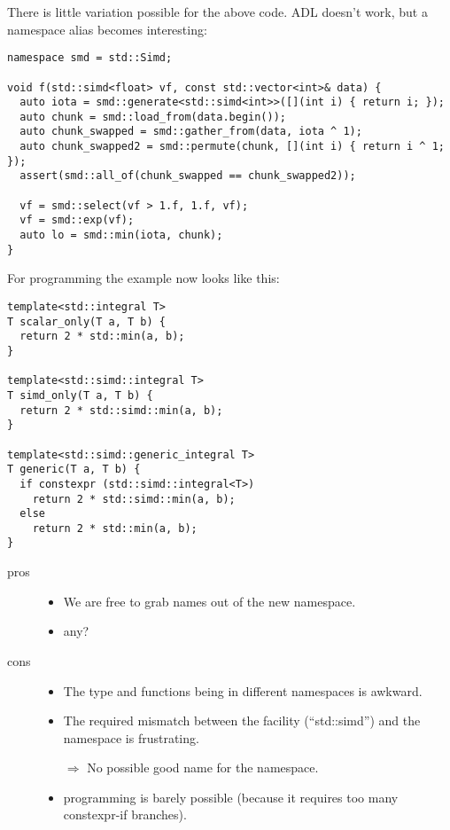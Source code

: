 There is little variation possible for the above code.
ADL doesn't work, but a namespace alias becomes interesting:
\medskip\begin{lstlisting}[style=Vc]
namespace smd = std::Simd;

void f(std::simd<float> vf, const std::vector<int>& data) {
  auto iota = smd::generate<std::simd<int>>([](int i) { return i; });
  auto chunk = smd::load_from(data.begin());
  auto chunk_swapped = smd::gather_from(data, iota ^ 1);
  auto chunk_swapped2 = smd::permute(chunk, [](int i) { return i ^ 1; });
  assert(smd::all_of(chunk_swapped == chunk_swapped2));

  vf = smd::select(vf > 1.f, 1.f, vf);
  vf = smd::exp(vf);
  auto lo = smd::min(iota, chunk);
}
\end{lstlisting}

For \simdgeneric programming the example now looks like this:
\medskip\begin{lstlisting}[style=Vc]
template<std::integral T>
T scalar_only(T a, T b) {
  return 2 * std::min(a, b);
}

template<std::simd::integral T>
T simd_only(T a, T b) {
  return 2 * std::simd::min(a, b);
}

template<std::simd::generic_integral T>
T generic(T a, T b) {
  if constexpr (std::simd::integral<T>)
    return 2 * std::simd::min(a, b);
  else
    return 2 * std::min(a, b);
}
\end{lstlisting}

\begin{description}
  \item[pros]
    \begin{itemize}
      \item We are free to grab names out of the new namespace.
      \item any?
    \end{itemize}

  \item[cons]
    \begin{itemize}
      \item The type and functions being in different namespaces is awkward.
      \item The required mismatch between the facility (“std::simd”) and the
        namespace is frustrating.
      \item[$\Rightarrow$] No possible good name for the namespace.

      \item \simdgeneric programming is barely possible (because it requires
        too many constexpr-if branches).
    \end{itemize}
\end{description}

